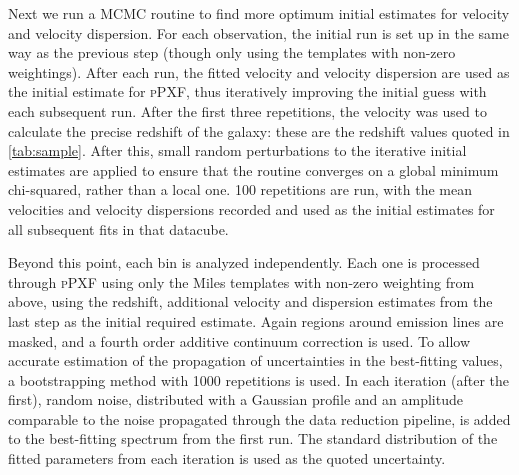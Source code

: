 



		Next we run a MCMC routine to find more optimum initial estimates for velocity and velocity dispersion. For each observation, the initial run is set up in the same way as the previous step (though only using the templates with non-zero weightings). After each run, the fitted velocity and velocity dispersion are used as the initial estimate for \textsc{pPXF}, thus iteratively improving the initial guess with each subsequent run. After the first three repetitions, the velocity was used to calculate the precise redshift of the galaxy: these are the redshift values quoted in \ref{tab:sample}. After this, small random perturbations to the iterative initial estimates are applied to ensure that the routine converges on a global minimum chi-squared, rather than a local one. 100 repetitions are run, with the mean velocities and velocity dispersions recorded and used as the initial estimates for all subsequent fits in that datacube. 

		Beyond this point, each bin is analyzed independently. Each one is processed through \textsc{pPXF} using only the Miles templates with non-zero weighting from above, using the redshift, additional velocity and dispersion estimates from the last step as the initial required estimate. Again regions around emission lines are masked, and a fourth order additive continuum correction is used. To allow accurate estimation of the propagation of uncertainties in the best-fitting values, a bootstrapping method with 1000 repetitions is used. In each iteration (after the first), random noise, distributed with a Gaussian profile and an amplitude comparable to the noise propagated through the data reduction pipeline, is added to the best-fitting spectrum from the first run. The standard distribution of the fitted parameters from each iteration is used as the quoted uncertainty.


